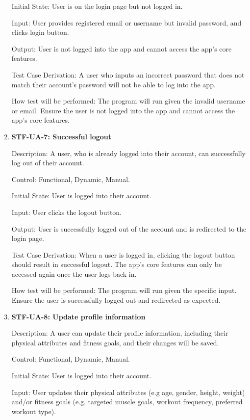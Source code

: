 \documentclass[12pt, titlepage]{article}
\begin{document}
\begin{enumerate}
        Initial State: User is on the login page but not logged in.

        Input: User provides registered email or username but invalid password, and clicks login button.

        Output: User is not logged into the app and cannot access the app’s core features.

        Test Case Derivation: A user who inputs an incorrect password that does not match their account’s password will not be able to log into the app.

        How test will be performed: The program will run given the invalid username or email. Ensure the user is not logged into the app and cannot access the app’s core features.

        \item{\textbf{STF-UA-7: Successful logout}\\}

        Description: A user, who is already logged into their account, can successfully log out of their account.

        Control: Functional, Dynamic, Manual.

        Initial State: User is logged into their account.

        Input: User clicks the logout button.

        Output: User is successfully logged out of the account and is redirected to the login page.

        Test Case Derivation: When a user is logged in, clicking the logout button should result in successful logout. The app’s core features can only be accessed again once the user logs back in.

        How test will be performed: The program will run given the specific input. Ensure the user is successfully logged out and redirected as expected.

        \item{\textbf{STF-UA-8: Update profile information}\\}

        Description: A user can update their profile information, including their physical attributes and fitness goals, and their changes will be saved.

        Control: Functional, Dynamic, Manual.

        Initial State: User is logged into their account.

        Input: User updates their physical attributes (e.g age, gender, height, weight) and/or fitness goals (e.g. targeted muscle goals, workout frequency, preferred workout type).


\end{enumerate}
\end{document}
